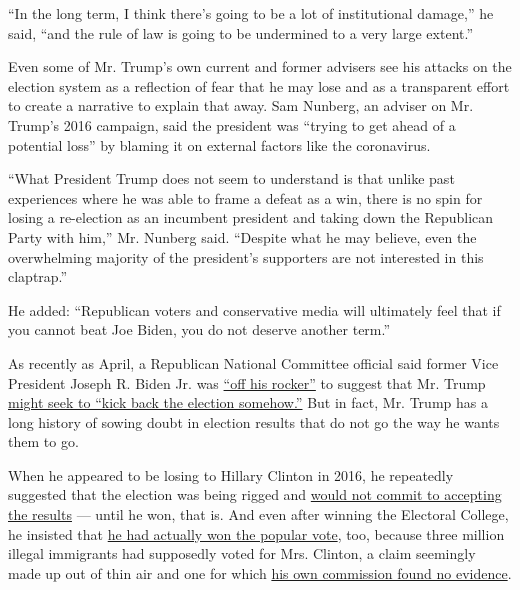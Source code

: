 ``In the long term, I think there's going to be a lot of institutional
damage,'' he said, ``and the rule of law is going to be undermined to a
very large extent.''

Even some of Mr. Trump's own current and former advisers see his attacks
on the election system as a reflection of fear that he may lose and as a
transparent effort to create a narrative to explain that away. Sam
Nunberg, an adviser on Mr. Trump's 2016 campaign, said the president was
``trying to get ahead of a potential loss'' by blaming it on external
factors like the coronavirus.

``What President Trump does not seem to understand is that unlike past
experiences where he was able to frame a defeat as a win, there is no
spin for losing a re-election as an incumbent president and taking down
the Republican Party with him,'' Mr. Nunberg said. ``Despite what he may
believe, even the overwhelming majority of the president's supporters
are not interested in this claptrap.''

He added: ``Republican voters and conservative media will ultimately
feel that if you cannot beat Joe Biden, you do not deserve another
term.''

As recently as April, a Republican National Committee official said
former Vice President Joseph R. Biden Jr. was
\href{https://twitter.com/SteveGuest/status/1253796935011651587}{``off
his rocker''} to suggest that Mr. Trump
\href{https://www.nytimes3xbfgragh.onion/2020/04/24/us/politics/joseph-biden-trump-election.html?smid=tw-share}{might
seek to ``kick back the election somehow.''} But in fact, Mr. Trump has
a long history of sowing doubt in election results that do not go the
way he wants them to go.

When he appeared to be losing to Hillary Clinton in 2016, he repeatedly
suggested that the election was being rigged and
\href{https://www.nytimes3xbfgragh.onion/2016/10/20/us/politics/presidential-debate.html}{would
not commit to accepting the results} --- until he won, that is. And even
after winning the Electoral College, he insisted that
\href{https://www.nytimes3xbfgragh.onion/2016/11/27/us/politics/trump-adviser-steps-up-searing-attack-on-romney.html}{he
had actually won the popular vote}, too, because three million illegal
immigrants had supposedly voted for Mrs. Clinton, a claim seemingly made
up out of thin air and one for which
\href{https://www.nytimes3xbfgragh.onion/2018/01/03/us/politics/trump-voter-fraud-commission.html}{his
own commission found no evidence}.

